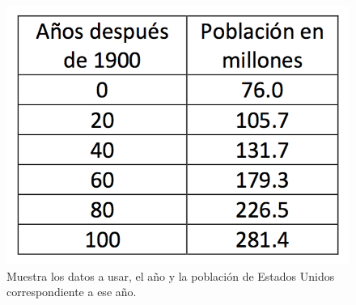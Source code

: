 \documentclass[11pt, spanish]{article}
\begin{document}
\begin{figure}[H]
\centering
	\includegraphics[scale=0.4]{data/img/table}
	\caption{Muestra los datos a usar, el año y la población de Estados Unidos correspondiente a ese año.}
\end{figure}
\end{document}
